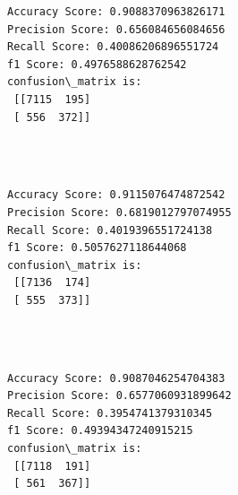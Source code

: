 \documentclass[11pt]{article}
\begin{document}
  

    \begin{Verbatim}[commandchars=\\\{\}]
Accuracy Score: 0.9088370963826171
Precision Score: 0.656084656084656
Recall Score: 0.40086206896551724
f1 Score: 0.4976588628762542
confusion\_matrix is: 
 [[7115  195]
 [ 556  372]] 


    \end{Verbatim}



    \begin{center}
    \end{center}
    { \hspace*{\fill} \\}
   

    \begin{Verbatim}[commandchars=\\\{\}]
Accuracy Score: 0.9115076474872542
Precision Score: 0.6819012797074955
Recall Score: 0.4019396551724138
f1 Score: 0.5057627118644068
confusion\_matrix is: 
 [[7136  174]
 [ 555  373]] 


    \end{Verbatim}

   

    \begin{center}
    \end{center}
    { \hspace*{\fill} \\}
    
   

    \begin{Verbatim}[commandchars=\\\{\}]
Accuracy Score: 0.9087046254704383
Precision Score: 0.6577060931899642
Recall Score: 0.3954741379310345
f1 Score: 0.49394347240915215
confusion\_matrix is: 
 [[7118  191]
 [ 561  367]] 


    \end{Verbatim}

   

    \begin{center}
    \end{center}
    { \hspace*{\fill} \\}
    
\end{document}
